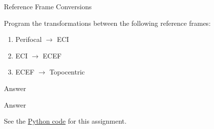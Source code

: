 


%
%

\newcommand{\hmwkTitle}{HW02}
\newcommand{\hmwkSubTitle}{Reference Frames and Ground Tracks}
\newcommand{\hmwkDueDate}{October 11th. 2025}
\newcommand{\hmwkDueTime}{11:59 PM}
\newcommand{\hmwkClass}{ENAE 441 - 0101}
\newcommand{\hmwkClassTime}{09:30 AM}
\newcommand{\hmwkClassInstructor}{Dr. Martin}
\newcommand{\hmwkAuthorName}{\textbf{Vai Srivastava}}
\newcommand{\hmwkCompletionDate}{\today}



\maketitle

\pagebreak

\begin{hwkProblem}{1}{Reference Frame Conversions} \label{hwk:p01}

	Program the transformations between the following reference frames:
	\begin{enumerate}
		\item \label{hwk:p01a} Perifocal \( \to \) ECI
		\item \label{hwk:p01b} ECI \( \to \) ECEF
		\item \label{hwk:p01c} ECEF \( \to \) Topocentric
	\end{enumerate}

	\hwkSol{} \label{hwk:s01}

	\hwkPart{} \label{hwk:s01a}

	Answer

	\hwkPart{} \label{hwk:s01b}

	Answer

	\hwkCode{} \label{code:s01}

	See the \href{https://www.github.com/vaisriv/enae441-hw02/blob/main/code/hw02.py}{Python code} for this assignment.

\end{hwkProblem}

